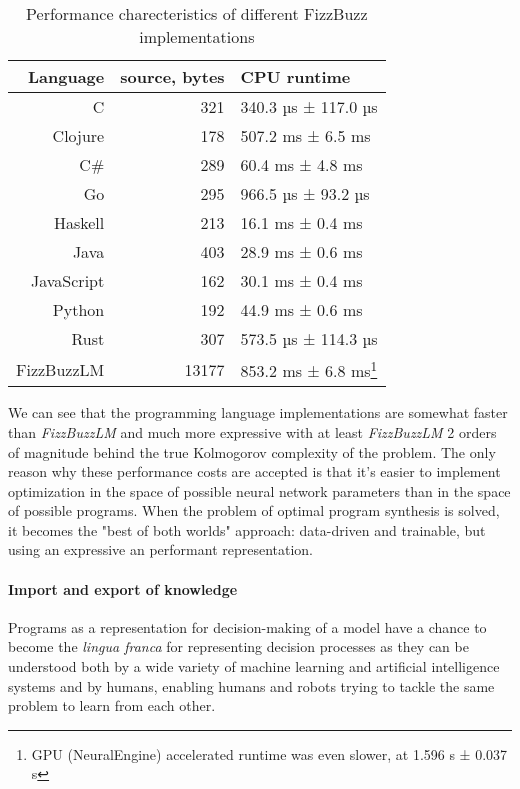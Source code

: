\begin{table}[H]
    \centering
    \begin{tabular}{r|r|l}
         Language & source, bytes & CPU runtime \\
         \midrule
         C & 321 & 340.3 µs ± 117.0 µs \\
         Clojure & 178 & 507.2 ms ± 6.5 ms \\
         C\# & 289 & 60.4 ms ± 4.8 ms \\
         Go & 295 & 966.5 µs ±  93.2 µs \\
         Haskell & 213 & 16.1 ms ± 0.4 ms \\
         Java & 403 & 28.9 ms ± 0.6 ms \\
         JavaScript & 162 & 30.1 ms ± 0.4 ms \\
         Python & 192 & 44.9 ms ± 0.6 ms \\
         Rust & 307 & 573.5 µs ± 114.3 µs \\
         FizzBuzzLM & 13177 & 853.2 ms ± 6.8 ms\footnote{GPU (NeuralEngine) accelerated runtime was even slower, at 1.596 s ± 0.037 s}
    \end{tabular}
    \caption{Performance charecteristics of different FizzBuzz implementations}
    \label{tab:my_label}
\end{table}

We can see that the programming language implementations are somewhat faster than \emph{FizzBuzzLM} and much more expressive with at least \emph{FizzBuzzLM} 2 orders of magnitude behind the true Kolmogorov complexity \cite{kolmogorov} of the problem.
The only reason why these performance costs are accepted is that it's easier to implement optimization in the space of possible neural network parameters than in the space of possible programs. 
When the problem of optimal program synthesis is solved, it becomes the "best of both worlds" approach: data-driven and trainable, but using an expressive an performant representation.
 
\paragraph{Import and export of knowledge}

Programs as a representation for decision-making of a model have a chance to become the \emph{lingua franca} for representing decision processes as they can be understood both by a wide variety of machine learning and artificial intelligence systems and by humans, enabling humans and robots trying to tackle the same problem to learn from each other.

